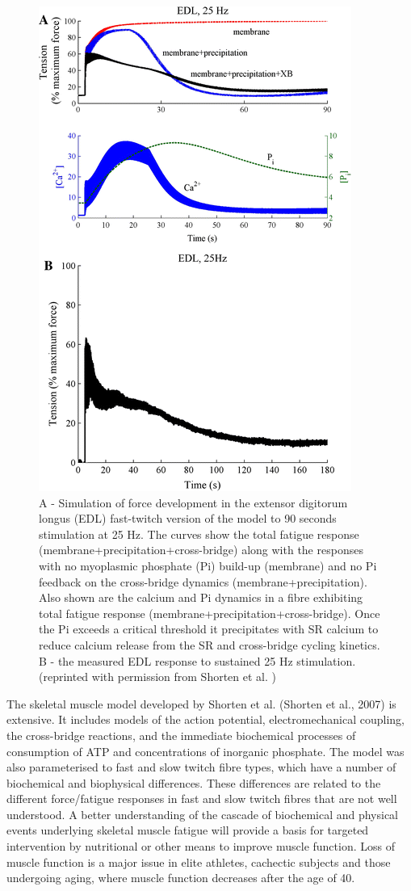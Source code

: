 \documentclass[fleqn,10pt]{physiome}
\begin{document}
\begin{figure}[ht!]
\centering
\includegraphics[width=0.5\linewidth]{fig01}
\caption{A - Simulation of force development in the extensor digitorum longus (EDL) fast-twitch version of the model to 90 seconds stimulation at 25 Hz. The curves show the total fatigue response (membrane+precipitation+cross-bridge) along with the responses with no myoplasmic phosphate (Pi) build-up (membrane) and no Pi feedback on the cross-bridge dynamics (membrane+precipitation). Also shown are the calcium and Pi dynamics in a fibre exhibiting total fatigue response (membrane+precipitation+cross-bridge). Once the Pi exceeds a critical threshold it precipitates with SR calcium to reduce calcium release from the SR and cross-bridge cycling kinetics. 
B - the measured EDL response to sustained 25 Hz stimulation. 
(reprinted with permission from Shorten et al. \citep{shorten2007mathematical})
}
\label{fig01}
\end{figure}

The skeletal muscle model developed by Shorten et al. (Shorten et al., 2007) is extensive. It includes models of the action potential, electromechanical coupling, the cross-bridge reactions, and the immediate biochemical processes of consumption of ATP and concentrations of inorganic phosphate. The model was also parameterised to fast and slow twitch fibre types, which have a number of biochemical and biophysical differences. These differences are related to the different force/fatigue responses in fast and slow twitch fibres that are not well understood. A better understanding of the cascade of biochemical and physical events underlying skeletal muscle fatigue will provide a basis for targeted intervention by nutritional or other means to improve muscle function. Loss of muscle function is a major issue in elite athletes, cachectic subjects and those undergoing aging, where muscle function decreases after the age of 40.
\end{document}
